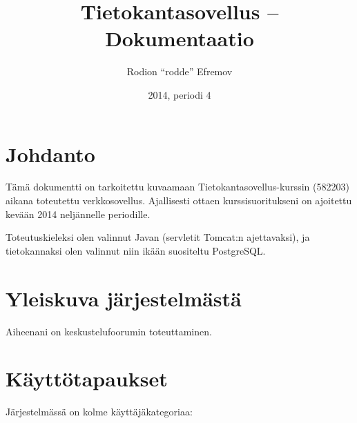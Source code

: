\documentclass[10pt]{article}
\title{Tietokantasovellus -- Dokumentaatio}
\date{2014, periodi 4}
\author{Rodion ``rodde'' Efremov}
\begin{document}
\maketitle

\section{Johdanto} Tämä dokumentti on tarkoitettu kuvaamaan Tietokantasovellus-kurssin (582203) aikana toteutettu verkkosovellus. Ajallisesti ottaen kurssisuoritukseni on ajoitettu kevään 2014 neljännelle periodille.

Toteutuskieleksi olen valinnut Javan (servletit Tomcat:n ajettavaksi), ja tietokannaksi olen valinnut niin ikään suositeltu PostgreSQL.

\section{Yleiskuva järjestelmästä}
Aiheenani on keskustelufoorumin toteuttaminen. 

\section{Käyttötapaukset}
Järjestelmässä on kolme käyttäjäkategoriaa: 
\end{document}
